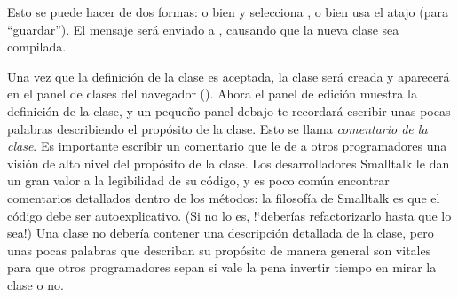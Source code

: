 \documentclass[a4paper,10pt,twoside]{book}
\begin{document}
Esto se puede hacer de dos formas: o bien \actclick y selecciona , o bien
usa el atajo  (para ``guardar'').
El mensaje ser\'a enviado a , causando que la nueva clase sea compilada.

Una vez que la definici\'on de la clase es aceptada, la clase ser\'a creada y aparecer\'a en el panel de clases del navegador ().
Ahora el panel de edici\'on muestra la definici\'on de la clase, y un peque\~no panel debajo te recordar\'a escribir unas pocas palabras describiendo el prop\'osito de la clase. Esto se llama \emph {comentario de la clase}. Es importante escribir un comentario que le de a otros programadores una visi\'on de alto nivel del prop\'osito de la clase.
Los desarrolladores Smalltalk le dan un gran valor a la legibilidad de su c\'odigo, y es poco com\'un encontrar comentarios detallados dentro de los m\'etodos: la filosof\'ia de Smalltalk es que el c\'odigo debe ser autoexplicativo. (Si no lo es, !`deber\'ias refactorizarlo hasta que lo sea!) Una clase  no deber\'ia contener una descripci\'on detallada de la clase, pero unas pocas palabras que describan su prop\'osito de manera general son vitales para que otros programadores sepan si vale la pena invertir tiempo en mirar la clase o no.

\end{document}
